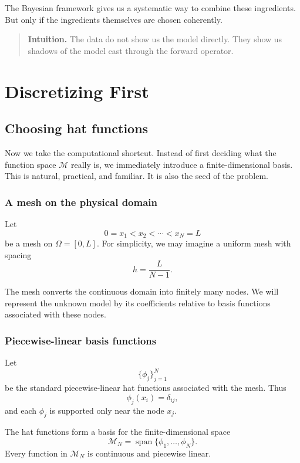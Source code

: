 \documentclass[11pt,a4paper]{book}
\newenvironment{intuition}
  {\begin{quote}\textbf{Intuition.}}
  {\end{quote}}
\newcommand{\M}{\mathcal{M}}      %
\begin{document}
The Bayesian framework gives us a systematic way to combine these ingredients.
But only if the ingredients themselves are chosen coherently.

\begin{intuition}
The data do not show us the model directly.
They show us shadows of the model cast through the forward operator.
\end{intuition}


\chapter{Discretizing First}

\section{Choosing hat functions}

Now we take the computational shortcut. Instead of first deciding what the
function space $\M$ really is, we immediately introduce a finite-dimensional
basis. This is natural, practical, and familiar. It is also the seed of the
problem.

\subsection{A mesh on the physical domain}

Let
\[
    0 = x_1 < x_2 < \cdots < x_N = L
\]
be a mesh on $\Omega = [0,L]$. For simplicity, we may imagine a uniform mesh
with spacing
\[
    h = \frac{L}{N-1}.
\]

The mesh converts the continuous domain into finitely many nodes. We will
represent the unknown model by its coefficients relative to basis functions
associated with these nodes.

\subsection{Piecewise-linear basis functions}

Let
\[
    \{\phi_j\}_{j=1}^N
\]
be the standard piecewise-linear hat functions associated with the mesh. Thus
\[
    \phi_j(x_i) = \delta_{ij},
\]
and each $\phi_j$ is supported only near the node $x_j$.

The hat functions form a basis for the finite-dimensional space
\[
    \M_N
    =
    \operatorname{span}\{\phi_1,\ldots,\phi_N\}.
\]
Every function in $\M_N$ is continuous and piecewise linear.
\end{document}
